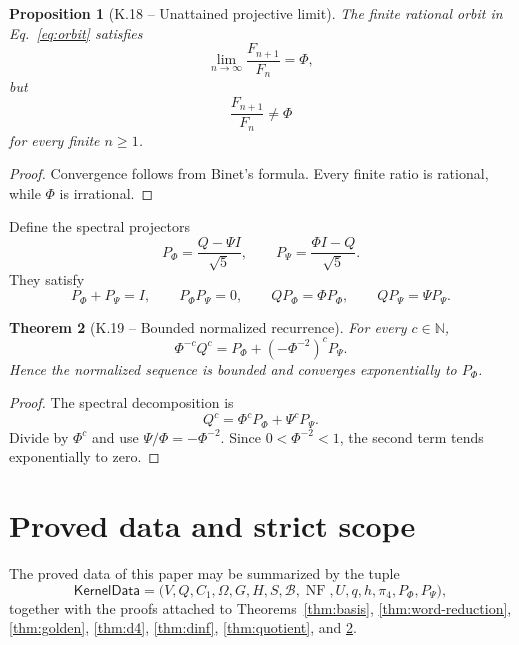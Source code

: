 \documentclass[11pt,letterpaper]{article}
\theoremstyle{kernelstyle}
\newtheorem{theorem}{Theorem}[section]
\newtheorem{proposition}[theorem]{Proposition}
\newcommand{\N}{\mathbb{N}}
\newcommand{\NF}{\operatorname{NF}}
\begin{document}
\begin{proposition}[K.18 -- Unattained projective limit]\label{prop:horizon}
The finite rational orbit in Eq.~\eqref{eq:orbit} satisfies
\begin{equation}
\lim_{n\to\infty}\frac{F_{n+1}}{F_n}=\Phi,
\end{equation}
but
\begin{equation}
\frac{F_{n+1}}{F_n}\ne\Phi
\end{equation}
for every finite $n\ge1$.
\end{proposition}

\begin{proof}
Convergence follows from Binet's formula.  Every finite ratio is rational, while $\Phi$ is irrational.
\end{proof}

Define the spectral projectors
\begin{equation}\label{eq:projectors}
P_\Phi=\frac{Q-\Psi I}{\sqrt5},
\qquad
P_\Psi=\frac{\Phi I-Q}{\sqrt5}.
\end{equation}
They satisfy
\begin{equation}
P_\Phi+P_\Psi=I,
\qquad
P_\Phi P_\Psi=0,
\qquad
QP_\Phi=\Phi P_\Phi,
\qquad
QP_\Psi=\Psi P_\Psi.
\end{equation}

\begin{theorem}[K.19 -- Bounded normalized recurrence]\label{thm:normalized}
For every $c\in\N$,
\begin{equation}\label{eq:normalized}
\Phi^{-c}Q^c
=P_\Phi+(-\Phi^{-2})^cP_\Psi.
\end{equation}
Hence the normalized sequence is bounded and converges exponentially to $P_\Phi$.
\end{theorem}

\begin{proof}
The spectral decomposition is
\[
Q^c=\Phi^cP_\Phi+\Psi^cP_\Psi.
\]
Divide by $\Phi^c$ and use $\Psi/\Phi=-\Phi^{-2}$.  Since $0<\Phi^{-2}<1$, the second term tends exponentially to zero.
\end{proof}

\section{Proved data and strict scope}\label{sec:export}

The proved data of this paper may be summarized by the tuple
\begin{equation}\label{eq:export}
\mathsf{KernelData}
=
\bigl(
V,Q,C_1,\Omega,G,H,S,\mathcal B,\NF,U,q,h,\pi_4,P_\Phi,P_\Psi
\bigr),
\end{equation}
together with the proofs attached to Theorems~\ref{thm:basis}, \ref{thm:word-reduction}, \ref{thm:golden}, \ref{thm:d4}, \ref{thm:dinf}, \ref{thm:quotient}, and \ref{thm:normalized}.
\end{document}
